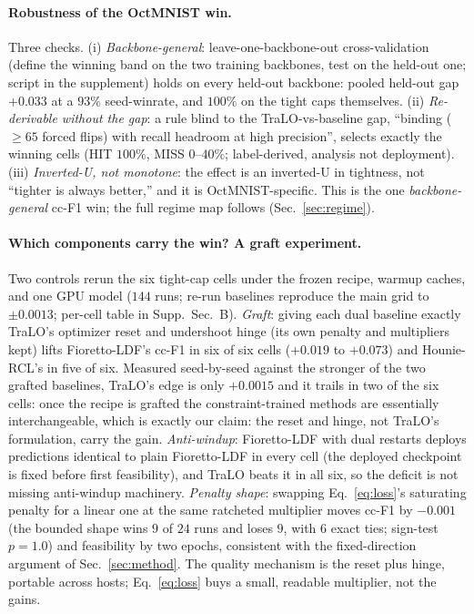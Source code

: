 \documentclass[letterpaper]{article} %
\begin{document}
\paragraph{Robustness of the OctMNIST win.}
Three checks. (i) \emph{Backbone-general}: leave-one-backbone-out cross-validation
(define the winning band on the two training backbones, test on the held-out one; script
in the supplement) holds on every held-out backbone: pooled held-out gap $+0.033$ at a
$93\%$ seed-winrate, and $100\%$ on the tight caps themselves.
(ii) \emph{Re-derivable without the gap}: a rule blind to the TraLO-vs-baseline
gap, ``binding ($\ge 65$ forced flips) with recall headroom at high precision'', selects
exactly the winning cells (HIT $100\%$, MISS $0$--$40\%$; label-derived, analysis not
deployment). (iii) \emph{Inverted-U, not monotone}: the effect is an
inverted-U in tightness, not ``tighter is always better,'' and it is OctMNIST-specific.
This is the one \emph{backbone-general} cc-F1 win; the full regime map follows
(Sec.~\ref{sec:regime}).

\paragraph{Which components carry the win? A graft experiment.}
\label{sec:graft}
Two controls rerun the six tight-cap cells under the frozen recipe, warmup caches, and
one GPU model ($144$ runs; re-run baselines reproduce the main grid to $\pm0.0013$;
per-cell table in Supp.~Sec.~B). \emph{Graft}: giving each dual baseline exactly TraLO's
optimizer reset and undershoot hinge (its own penalty and multipliers kept) lifts
Fioretto-LDF's cc-F1 in six of six cells ($+0.019$ to $+0.073$) and Hounie-RCL's in
five of six. Measured seed-by-seed against the stronger of the two grafted baselines,
TraLO's edge is only $+0.0015$ and it trails in two of the six cells: once the recipe is
grafted the constraint-trained methods are essentially interchangeable, which is exactly
our claim: the reset and hinge, not TraLO's formulation, carry the gain. \emph{Anti-windup}: Fioretto-LDF with dual restarts
\citep{gallego2022controlled} deploys predictions identical to plain Fioretto-LDF in
every cell (the deployed checkpoint is fixed before first feasibility), and TraLO beats
it in all six, so the deficit is not missing anti-windup machinery. \emph{Penalty shape}:
swapping Eq.~\eqref{eq:loss}'s saturating penalty for a linear one at the same ratcheted
multiplier moves cc-F1 by $-0.001$ (the bounded shape wins $9$ of $24$ runs and loses $9$,
with $6$ exact ties; sign-test $p{=}1.0$) and feasibility by two epochs, consistent with
the fixed-direction argument of Sec.~\ref{sec:method}. The quality mechanism is the reset
plus hinge, portable across hosts; Eq.~\eqref{eq:loss} buys a small, readable multiplier,
not the gains.
\end{document}
